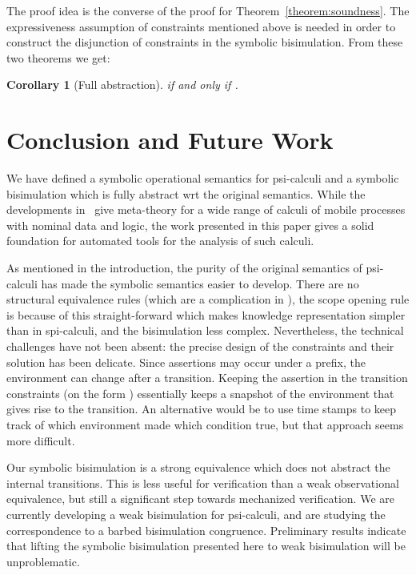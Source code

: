 \documentclass{eptcs}
\newtheorem{corollary}[definition]{Corollary}
\theoremstyle{definition}
\begin{document}
The proof idea is the converse of the proof for Theorem~\ref{theorem:soundness}. The expressiveness assumption of constraints mentioned above is needed in order to construct the disjunction of constraints in the symbolic bisimulation. 
From these two theorems we get:
\begin{corollary}[Full abstraction]
 if and only if .
\end{corollary}

\section{Conclusion and Future Work}

\label{sec:conclusion}
We have defined a symbolic operational semantics for psi-calculi and a
symbolic bisimulation which is fully abstract wrt the original
semantics. 
While the developments
in~\cite{bengtson.johansson.ea:psi-calculi} give meta-theory for a
wide range of calculi of mobile processes with nominal data and
logic, the work presented in this paper gives a solid foundation for
automated tools for the analysis of such calculi.  


As mentioned in the introduction, the purity of the original semantics
of psi-calculi has made the symbolic semantics easier to develop.
There are no structural equivalence rules (which are a complication in
\api), the scope opening rule is because of this straight-forward
which makes knowledge representation simpler than in spi-calculi, and
the bisimulation less complex.
Nevertheless, the technical challenges have not been absent: the
precise design of the constraints and their solution has been
delicate.  Since assertions may occur under a prefix, the environment can
change after a transition. Keeping the assertion  in the
transition constraints
(on the form ) essentially keeps
a snapshot of the environment that gives rise to the transition. An
alternative would be to use time stamps to keep track of which environment
made which condition true, but that approach seems more difficult.

Our symbolic bisimulation is a strong equivalence which does not
abstract the internal  transitions. This is less useful for
verification than a weak observational equivalence, but still a
significant step towards mechanized verification.
We are currently developing a weak bisimulation for psi-calculi, and
are studying the correspondence to a barbed bisimulation congruence.
Preliminary results indicate that lifting the symbolic bisimulation
presented here to weak bisimulation will be unproblematic.
\end{document}
